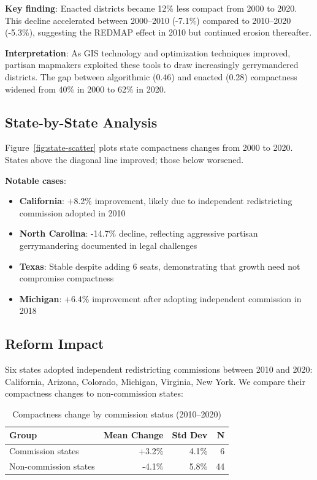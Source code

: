 \textbf{Key finding}: Enacted districts became 12\% less compact from 2000 to 2020. This decline accelerated between 2000--2010 (-7.1\%) compared to 2010--2020 (-5.3\%), suggesting the REDMAP effect in 2010 but continued erosion thereafter.

\textbf{Interpretation}: As GIS technology and optimization techniques improved, partisan mapmakers exploited these tools to draw increasingly gerrymandered districts. The gap between algorithmic (0.46) and enacted (0.28) compactness widened from 40\% in 2000 to 62\% in 2020.

\subsection{State-by-State Analysis}

Figure~\ref{fig:state-scatter} plots state compactness changes from 2000 to 2020. States above the diagonal line improved; those below worsened.

\textbf{Notable cases}:
\begin{itemize}
    \item \textbf{California}: +8.2\% improvement, likely due to independent redistricting commission adopted in 2010
    \item \textbf{North Carolina}: -14.7\% decline, reflecting aggressive partisan gerrymandering documented in legal challenges
    \item \textbf{Texas}: Stable despite adding 6 seats, demonstrating that growth need not compromise compactness
    \item \textbf{Michigan}: +6.4\% improvement after adopting independent commission in 2018
\end{itemize}

\subsection{Reform Impact}

Six states adopted independent redistricting commissions between 2010 and 2020: California, Arizona, Colorado, Michigan, Virginia, New York. We compare their compactness changes to non-commission states:

\begin{table}[h]
\centering
\begin{tabular}{lrrr}
\toprule
\textbf{Group} & \textbf{Mean Change} & \textbf{Std Dev} & \textbf{N} \\
\midrule
Commission states    & +3.2\% & 4.1\% & 6 \\
Non-commission states & -4.1\% & 5.8\% & 44 \\
\bottomrule
\end{tabular}
\caption{Compactness change by commission status (2010--2020)}
\end{table}

